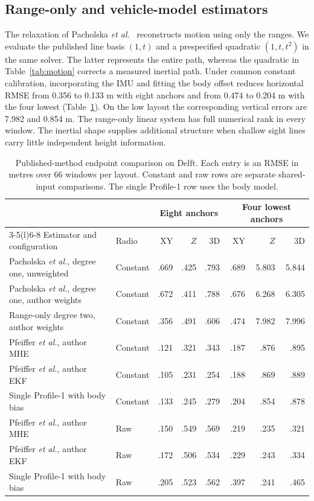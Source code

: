 \documentclass{IEEEtaes}
\begin{document}
\subsection{Range-only and vehicle-model estimators}
The relaxation of Pacholska \emph{et al.}~\cite{pacholska} reconstructs motion using only the ranges. We evaluate the published line basis \((1,t)\) and a prespecified quadratic \((1,t,t^2)\) in the same solver. The latter represents the entire path, whereas the quadratic in Table~\ref{tab:motion} corrects a measured inertial path. Under common constant calibration, incorporating the IMU and fitting the body offset reduces horizontal RMSE from 0.356 to 0.133 m with eight anchors and from 0.474 to 0.204 m with the four lowest (Table~\ref{tab:published}). On the low layout the corresponding vertical errors are 7.982 and 0.854 m. The range-only linear system has full numerical rank in every window. The inertial shape supplies additional structure when shallow sight lines carry little independent height information.

\begin{table}[t]
\centering
\caption{Published-method endpoint comparison on Delft. Each entry is an RMSE in metres over 66 windows per layout. Constant and raw rows are separate shared-input comparisons. The single Profile-1 row uses the body model.}
\label{tab:published}\tablefont
\begin{tabular}{@{}llrrrrrr@{}}
\toprule
& &\multicolumn{3}{c}{Eight anchors}&\multicolumn{3}{c}{Four lowest anchors}\\
\cmidrule(lr){3-5}\cmidrule(l){6-8}
Estimator and configuration&Radio&XY&\(Z\)&3D&XY&\(Z\)&3D\\\midrule
Pacholska \emph{et al.}, degree one, unweighted&Constant&.669&.425&.793&.689&5.803&5.844\\
Pacholska \emph{et al.}, degree one, author weights&Constant&.672&.411&.788&.676&6.268&6.305\\
Range-only degree two, author weights&Constant&.356&.491&.606&.474&7.982&7.996\\
Pfeiffer \emph{et al.}, author MHE&Constant&.121&.321&.343&.187&.876&.895\\
Pfeiffer \emph{et al.}, author EKF&Constant&.105&.231&.254&.188&.869&.889\\
Single Profile-1 with body bias&Constant&.133&.245&.279&.204&.854&.878\\\midrule
Pfeiffer \emph{et al.}, author MHE&Raw&.150&.549&.569&.219&.235&.321\\
Pfeiffer \emph{et al.}, author EKF&Raw&.172&.506&.534&.229&.243&.334\\
Single Profile-1 with body bias&Raw&.205&.523&.562&.397&.241&.465\\
\bottomrule
\end{tabular}
\end{table}
\end{document}
